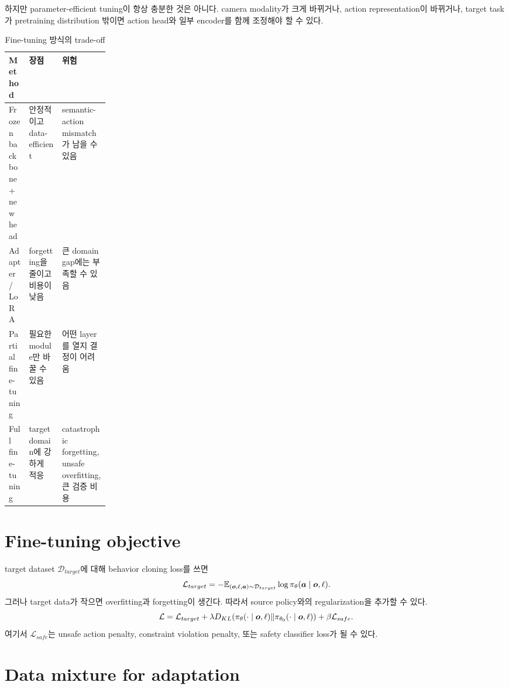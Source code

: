 하지만 parameter-efficient tuning이 항상 충분한 것은 아니다. camera modality가 크게 바뀌거나, action representation이 바뀌거나, target task가 pretraining distribution 밖이면 action head와 일부 encoder를 함께 조정해야 할 수 있다.

\begin{table}[h]
  \centering
  \caption{Fine-tuning 방식의 trade-off}
  \begin{tabularx}{\linewidth}{p{0.2\linewidth}X X}
    \toprule
    Method & 장점 & 위험 \\
    \midrule
    Frozen backbone + new head & 안정적이고 data-efficient & semantic-action mismatch가 남을 수 있음 \\
    Adapter / LoRA & forgetting을 줄이고 비용이 낮음 & 큰 domain gap에는 부족할 수 있음 \\
    Partial fine-tuning & 필요한 module만 바꿀 수 있음 & 어떤 layer를 열지 결정이 어려움 \\
    Full fine-tuning & target domain에 강하게 적응 & catastrophic forgetting, unsafe overfitting, 큰 검증 비용 \\
    \bottomrule
  \end{tabularx}
  \label{tab:ch15-ft-methods}
\end{table}

\section{Fine-tuning objective}

target dataset $\mathcal{D}_{target}$에 대해 behavior cloning loss를 쓰면
\begin{equation}
  \mathcal{L}_{target}
  =
  -
  \mathbb{E}_{(\bm{o},\ell,\bm{a})\sim\mathcal{D}_{target}}
  \log
  \pi_{\theta}(\bm{a}\mid\bm{o},\ell).
  \label{eq:ch15-target-loss}
\end{equation}
그러나 target data가 작으면 overfitting과 forgetting이 생긴다. 따라서 source policy와의 regularization을 추가할 수 있다.
\begin{equation}
  \mathcal{L}
  =
  \mathcal{L}_{target}
  +
  \lambda
  D_{KL}
  (
  \pi_{\theta}(\cdot\mid\bm{o},\ell)
  \|
  \pi_{\theta_0}(\cdot\mid\bm{o},\ell)
  )
  +
  \beta
  \mathcal{L}_{safe}.
  \label{eq:ch15-regularized-ft}
\end{equation}
여기서 $\mathcal{L}_{safe}$는 unsafe action penalty, constraint violation penalty, 또는 safety classifier loss가 될 수 있다.

\section{Data mixture for adaptation}

